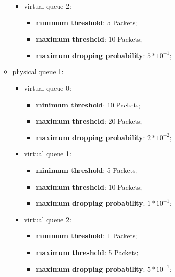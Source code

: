 \documentclass[conference,compsoc]{IEEEtran}
\begin{document}
\begin{itemize}
\begin{itemize}
\begin{itemize}
	   \item virtual queue 2:
   	  \begin{itemize}
     			\item \textbf{minimum threshold}: 5 Packets;
 			    \item \textbf{maximum threshold}: 10 Packets;
   			  \item \textbf{maximum dropping probability}: $5 * 10^{-1}$;
  	   \end{itemize}   
    \end{itemize}
    
    
      \item physical queue 1:
     \begin{itemize}
     	\item virtual queue 0:
     	\begin{itemize}
     		\item \textbf{minimum threshold}: 10 Packets;
		     \item \textbf{maximum threshold}: 20 Packets;
		     \item \textbf{maximum dropping probability}: $2 * 10^{-2}$;
         \end{itemize}
    	 \item virtual queue 1:
   	  \begin{itemize}
     			\item \textbf{minimum threshold}: 5 Packets;
 			    \item \textbf{maximum threshold}: 10 Packets;
   			  \item \textbf{maximum dropping probability}: $1 * 10^{-1}$;
  	   \end{itemize}
	   
	   \item virtual queue 2:
   	  \begin{itemize}
     			\item \textbf{minimum threshold}: 1 Packets;
 			    \item \textbf{maximum threshold}: 5 Packets;
   			  \item \textbf{maximum dropping probability}: $5 * 10^{-1}$;
  	   \end{itemize}   
    \end{itemize}



\end{itemize}
\end{itemize}
\end{document}
